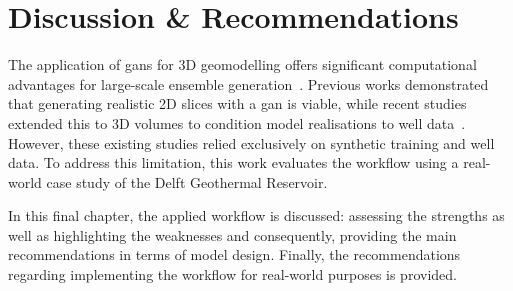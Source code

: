 \chapter{Discussion \& Recommendations}\label{Ch:Discussion}
The application of \glspl{gan} for 3D geomodelling offers significant computational advantages for large-scale ensemble generation~\parencite{sun2023geological,song2023gansim}. Previous works demonstrated that generating realistic 2D slices with a \gls{gan} is viable, while recent studies extended this to 3D volumes to condition model realisations to well data~\parencite{bhavsar2024stable,rongier2025atowards}. However, these existing studies relied exclusively on synthetic training and well data. To address this limitation, this work evaluates the workflow using a real-world case study of the Delft Geothermal Reservoir.

In this final chapter, the applied workflow is discussed: assessing the strengths as well as highlighting the weaknesses and consequently, providing the main recommendations in terms of model design. Finally, the recommendations regarding implementing the workflow for real-world purposes is provided.

